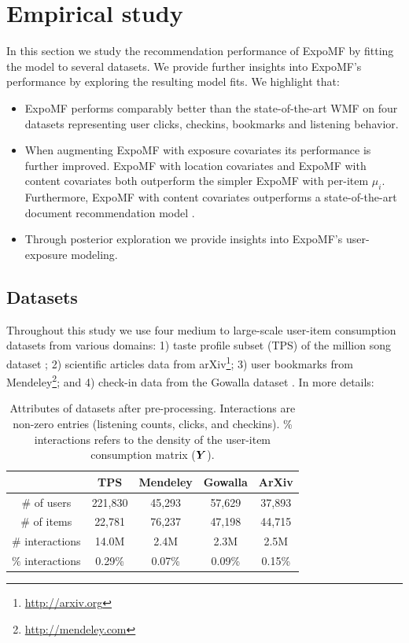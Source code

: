 \section{Empirical study}
\label{sec:experiments}

In this section we study the recommendation performance of ExpoMF by fitting
the model to several datasets. We provide further insights into ExpoMF's
performance by exploring the resulting model fits. We highlight that: 
\begin{itemize} 
\item ExpoMF performs comparably better than the state-of-the-art WMF
\cite{hu2008collaborative} on four datasets representing user clicks, checkins,
bookmarks and listening behavior.
\item When augmenting ExpoMF with exposure covariates its performance is
further improved. ExpoMF with location covariates and ExpoMF with content
covariates both outperform the simpler ExpoMF with per-item $\mu_i$.
Furthermore, ExpoMF with content covariates outperforms a state-of-the-art
document recommendation model \cite{wang2011collaborative}.  
\item Through posterior exploration we provide insights into ExpoMF's user-exposure modeling.
\end{itemize} 

\subsection{Datasets}
Throughout this study we use four medium to large-scale user-item consumption datasets from various domains: 
1) taste profile subset (TPS) of the million song dataset \cite{bertin2011million}; 2) scientific articles data from
arXiv\footnote{\url{http://arxiv.org}}; 3) user bookmarks from Mendeley\footnote{\url{http://mendeley.com}}; and 4) check-in
data from the Gowalla dataset \cite{cho2011friendship}. In more details:

\begin{table}
\centering
\begin{tabular}{ c c c c c  }
  \hline
   & \textbf{TPS} & \textbf{Mendeley} & \textbf{Gowalla} & \textbf{ArXiv} \\
   \hline
  \# of users & 221,830 & 45,293 & 57,629 & 37,893   \\
  \# of items & 22,781& 76,237 & 47,198 & 44,715 \\
  \# interactions & 14.0M &  2.4M & 2.3M & 2.5M\\
  $\%$ interactions & 0.29\% & 0.07\% & 0.09\% & 0.15\%\\
  \hline 
\end{tabular}
\caption{Attributes of datasets after pre-processing. Interactions are non-zero
entries (listening counts, clicks, and checkins). \% interactions refers to the
density of the user-item consumption matrix ($\boldsymbol{Y}$).}
\label{tab:data}
\end{table}

